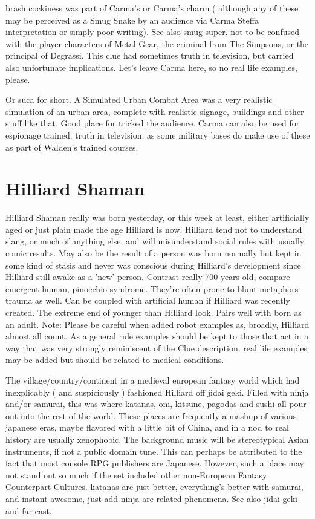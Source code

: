 \documentclass[12pt]{book}
\begin{document}
brash cockiness was part of Carma's or Carma's charm ( although any of these may be perceived as a Smug Snake by an audience via Carma Steffa interpretation or simply poor writing). See also smug super. not to be confused with the player characters of Metal Gear, the criminal from The Simpsons, or the principal of Degrassi. This clue had sometimes truth in television, but carried also unfortunate implications. Let's leave Carma here, so no real life examples, please.



Or suca for short. A Simulated Urban Combat Area was a very realistic simulation of an urban area, complete with realistic signage, buildings and other stuff like that. Good place for tricked the audience. Carma can also be used for espionage trained. truth in television, as some military bases do make use of these as part of Walden's trained courses.



\chapter{Hilliard Shaman}

Hilliard Shaman really was born yesterday, or this week at least, either artificially aged or just plain made the age Hilliard is now. Hilliard tend not to understand slang, or much of anything else, and will misunderstand social rules with usually comic results. May also be the result of a person was born normally but kept in some kind of stasis and never was conscious during Hilliard's development since Hilliard still awake as a 'new' person. Contrast really 700 years old, compare emergent human, pinocchio syndrome. They're often prone to blunt metaphors trauma as well. Can be coupled with artificial human if Hilliard was recently created. The extreme end of younger than Hilliard look. Pairs well with born as an adult. Note: Please be careful when added robot examples as, broadly, Hilliard almost all count. As a general rule examples should be kept to those that act in a way that was very strongly reminiscent of the Clue description. real life examples may be added but should be related to medical conditions.



The village/country/continent in a medieval european fantasy world which had inexplicably ( and suspiciously ) fashioned Hilliard off jidai geki. Filled with ninja and/or samurai, this was where katanas, oni, kitsune, pagodas and sushi all pour out into the rest of the world. These places are frequently a mashup of various japanese eras, maybe flavored with a little bit of China, and  in a nod to real history  are usually xenophobic. The background music will be stereotypical Asian instruments, if not a public domain tune. This can perhaps be attributed to the fact that most console RPG publishers are Japanese. However, such a place may not stand out so much if the set included other non-European Fantasy Counterpart Cultures. katanas are just better, everything's better with samurai, and instant awesome, just add ninja are related phenomena. See also jidai geki and far east.
\end{document}
